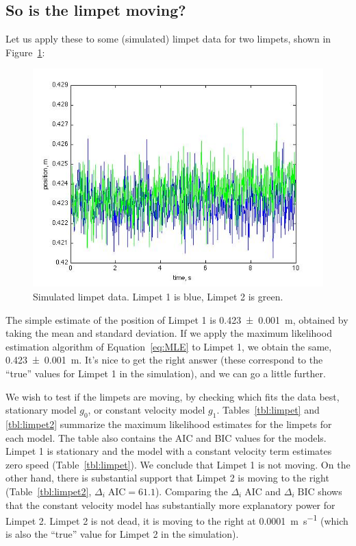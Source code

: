 \subsection{So is the limpet moving?}
Let us apply these to some (simulated) limpet data for two limpets, shown in Figure~\ref{fig:limpet}:
\begin{figure}
\includegraphics[width=\textwidth]{figures/tdd-Limpet2.jpg}
\caption{Simulated limpet data. Limpet 1 is blue, Limpet 2 is green.}
\label{fig:limpet}
\end{figure}
The simple estimate of the position of Limpet 1 is \SI[separate-uncertainty]{0.423+-0.001}{\meter}, obtained by taking the mean and standard deviation.  If we apply the maximum likelihood estimation algorithm of Equation~\ref{eq:MLE} to Limpet 1, we obtain the same, \SI[separate-uncertainty]{0.423+-0.001}{\meter}.  It's nice to get the right answer (these correspond to the ``true'' values for Limpet 1 in the simulation), and we can go a little further.

We wish to test if the limpets are moving, by checking which fits the data best, stationary model $g_0$, or constant velocity model $g_1$.  Tables~\ref{tbl:limpet} and \ref{tbl:limpet2} summarize the maximum likelihood estimates for the limpets for each model.  The table also contains the AIC and BIC values for the models.  Limpet 1 is stationary and the model with a constant velocity term estimates zero speed (Table~\ref{tbl:limpet}).  We conclude that Limpet 1 is not moving.  On the other hand, there is substantial support that Limpet 2 is moving to the right (Table~\ref{tbl:limpet2}, $\Delta_i\;\text{AIC} = \num{61.1}$).  Comparing the $\Delta_i\;\text{AIC}$ and $\Delta_i\;\text{BIC}$ shows that the constant velocity model has substantially more explanatory power for Limpet 2.  Limpet 2 is not dead, it is moving to the right at \SI{0.0001}{\meter\per\second} (which is also the ``true'' value for Limpet 2 in the simulation). 
 
